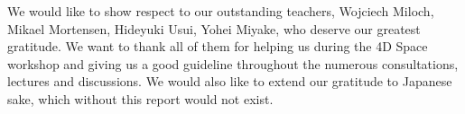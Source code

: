 \documentclass[aip, 
rsi, 
amsmath,
amssymb,
longbibliography,
preprint]{revtex4-1}
\begin{document}
\begin{acknowledgments}
We would like to show respect to our outstanding teachers, Wojciech Miloch, Mikael Mortensen, Hideyuki Usui, Yohei Miyake, who deserve our greatest gratitude. We want to thank all of them for helping us during the 4D Space workshop and giving us a good guideline throughout the numerous consultations, lectures and discussions. We would also like to extend our gratitude to Japanese sake, which without this report would not exist.
\end{acknowledgments}


\end{document}
